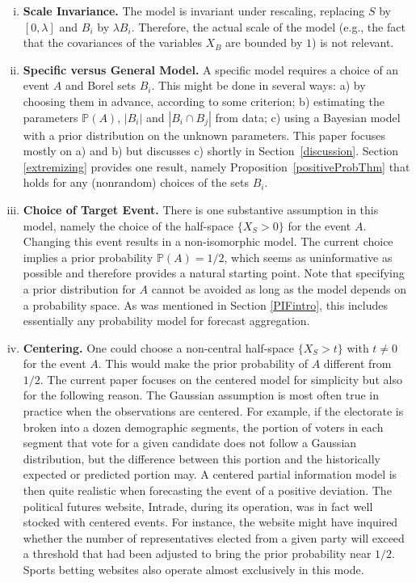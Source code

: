 \documentclass[11pt]{article}
\renewcommand{\P}{\mathbb{P}}
\theoremstyle{definition}
\theoremstyle{definition}
\def\P{{\mathbb P}}
\begin{document}
\begin{enumerate}[(i)]
\item {\bf Scale Invariance.} The model is invariant under rescaling,
replacing $S$ by $[0,\lambda]$ and $B_i$ by $\lambda B_i$.  Therefore,
the actual scale of the model (e.g., the fact that the covariances of
the variables $X_B$ are bounded by $1$) is not relevant.


\item {\bf Specific versus General Model.} A specific model requires a
choice of an event $A$ and Borel sets $B_i$.
This might be done in several ways: a) by choosing them in advance,
according to some criterion; b) estimating the parameters $\P(A)$,
$|B_i|$ and $|B_i \cap B_j|$ from data; c) using a Bayesian model
with a prior distribution on the unknown parameters.  This paper
focuses mostly on a) and b) but discusses c) shortly in
Section~\ref{discussion}.  Section \ref{extremizing} provides one
result, namely Proposition~\ref{positiveProbThm} that holds for any (nonrandom) choices of the sets $B_i$.
\label{item:specific}






\item {\bf Choice of Target Event.}  There is one substantive
assumption in this model, namely the choice of the half-space $\{ X_S
> 0 \}$ for the event $A$.  Changing this event results
in a non-isomorphic model. The current choice
implies a prior probability $\P(A) = 1/2$, which seems as
uninformative as possible and therefore provides a natural starting
point. Note that specifying a prior distribution for $A$ cannot be avoided as
long as the model depends on a probability space. As was mentioned in
Section \ref{PIFintro}, this includes essentially any probability
model for forecast aggregation.
\label{item:choice}

\item {\bf Centering.} One could choose a non-central half-space $\{
X_S > t \}$ with $t \neq 0$ for the event $A$.  This would make the prior
probability of $A$ different from $1/2$.  The current paper focuses on the
centered model for simplicity but also for the following reason.  The
Gaussian assumption is most often true in practice when the
observations are centered.  For example, if the electorate
is broken into a dozen demographic segments, the portion of voters in
each segment that vote for a given candidate does not follow a
Gaussian distribution, but the difference between this portion and the
historically expected or predicted portion may.  A centered partial
information model is then quite realistic when forecasting the event
of a positive deviation.  The political futures website, Intrade,
during its operation, was in fact well stocked with centered events. For instance, the website might have inquired whether 
 the number of representatives elected from a
given party will exceed a threshold that had been adjusted to
bring the prior probability near $1/2$.  Sports betting websites also operate
almost exclusively in this mode.
\label{item:centered}
\end{enumerate}
\end{document}

